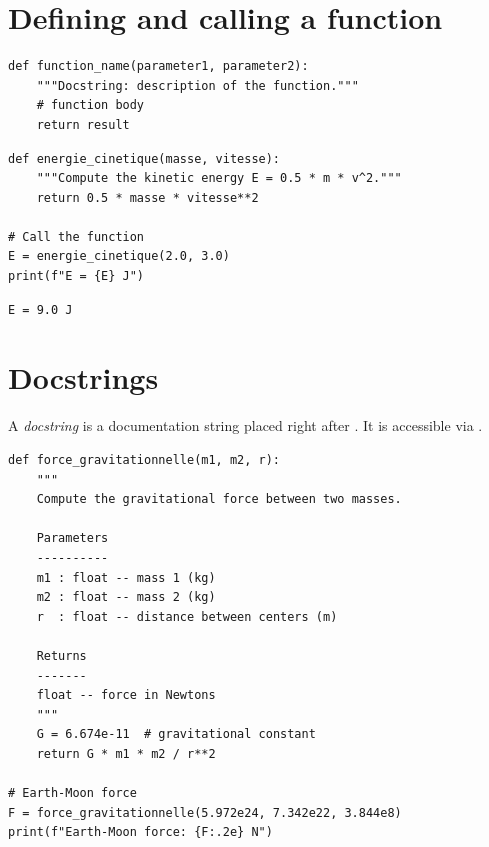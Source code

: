 \section{Defining and calling a function}

\begin{definition}
\begin{verbatim}
def function_name(parameter1, parameter2):
    """Docstring: description of the function."""
    # function body
    return result
\end{verbatim}
\end{definition}

\begin{codeblock}[title=\textbf{Python}]
\begin{verbatim}
def energie_cinetique(masse, vitesse):
    """Compute the kinetic energy E = 0.5 * m * v^2."""
    return 0.5 * masse * vitesse**2

# Call the function
E = energie_cinetique(2.0, 3.0)
print(f"E = {E} J")
\end{verbatim}
\end{codeblock}

\begin{codeoutput}
\begin{verbatim}
E = 9.0 J
\end{verbatim}
\end{codeoutput}

\section{Docstrings}

A \emph{docstring} is a documentation string placed right after .
It is accessible via .

\begin{codeblock}[title=\textbf{Python}]
\begin{verbatim}
def force_gravitationnelle(m1, m2, r):
    """
    Compute the gravitational force between two masses.

    Parameters
    ----------
    m1 : float -- mass 1 (kg)
    m2 : float -- mass 2 (kg)
    r  : float -- distance between centers (m)

    Returns
    -------
    float -- force in Newtons
    """
    G = 6.674e-11  # gravitational constant
    return G * m1 * m2 / r**2

# Earth-Moon force
F = force_gravitationnelle(5.972e24, 7.342e22, 3.844e8)
print(f"Earth-Moon force: {F:.2e} N")
\end{verbatim}
\end{codeblock}

